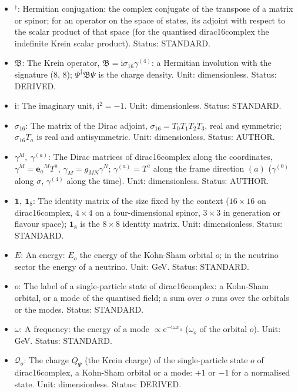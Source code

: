 \documentclass[
  10pt,
]{article}
\begin{document}
\begin{itemize}
  spinor field of eight dimensions;
  \(\bar\Psi = \Psi^\dagger\sigma_{16}\) is its Dirac adjoint; in a term
  of the fold, \(\Psi\) is its value at \(\sigma = 0\). Unit:
  GeV\(^{7/2}\). Status: AUTHOR.
\item
  \({}^\dagger\): Hermitian conjugation: the complex conjugate of the
  transpose of a matrix or spinor; for an operator on the space of
  states, its adjoint with respect to the scalar product of that space
  (for the quantised dirac16complex the indefinite Krein scalar
  product). Status: STANDARD.
\item
  \(\mathfrak{B}\): The Krein operator,
  \(\mathfrak{B} = \mathrm{i}\sigma_{16}\gamma^{(4)}\): a Hermitian
  involution with the signature (8, 8); \(\Psi^\dagger\mathfrak{B}\Psi\)
  is the charge density. Unit: dimensionless. Status: DERIVED.
\item
  \(\mathrm{i}\): The imaginary unit, \(\mathrm{i}^2 = -1\). Unit:
  dimensionless. Status: STANDARD.
\item
  \(\sigma_{16}\): The matrix of the Dirac adjoint,
  \(\sigma_{16} = T_0T_1T_2T_3\), real and symmetric; \(\sigma_{16}T_a\)
  is real and antisymmetric. Unit: dimensionless. Status: AUTHOR.
\item
  \(\gamma^M,\ \gamma^{(a)}\): The Dirac matrices of dirac16complex
  along the coordinates, \(\gamma^M = \mathbf{e}_a{}^MT^a\),
  \(\gamma_M = g_{MN}\gamma^N\); \(\gamma^{(a)} = T^a\) along the frame
  direction \((a)\) (\(\gamma^{(0)}\) along \(\sigma\), \(\gamma^{(4)}\)
  along the time). Unit: dimensionless. Status: AUTHOR.
\item
  \(\mathbf{1},\ \mathbf{1}_8\): The identity matrix of the size fixed
  by the context (\(16 \times 16\) on dirac16complex, \(4 \times 4\) on
  a four-dimensional spinor, \(3 \times 3\) in generation or flavour
  space); \(\mathbf{1}_8\) is the \(8 \times 8\) identity matrix. Unit:
  dimensionless. Status: STANDARD.
\item
  \(E\): An energy: \(E_o\) the energy of the Kohn-Sham orbital \(o\);
  in the neutrino sector the energy of a neutrino. Unit: GeV. Status:
  STANDARD.
\item
  \(o\): The label of a single-particle state of dirac16complex: a
  Kohn-Sham orbital, or a mode of the quantised field; a sum over \(o\)
  runs over the orbitals or the modes. Status: STANDARD.
\item
  \(\omega\): A frequency: the energy of a mode
  \(\propto \mathrm{e}^{-\mathrm{i}\omega x_4}\) (\(\omega_o\) of the
  orbital \(o\)). Unit: GeV. Status: STANDARD.
\item
  \(\mathcal{Q}_o\): The charge \(Q_\Psi\) (the Krein charge) of the
  single-particle state \(o\) of dirac16complex, a Kohn-Sham orbital or
  a mode: \(+1\) or \(-1\) for a normalised state. Unit: dimensionless.
  Status: DERIVED.
\end{itemize}
\end{document}
